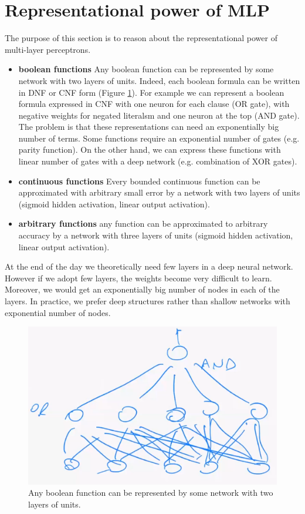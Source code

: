 \section{Representational power of MLP}
The purpose of this section is to reason about the representational power of multi-layer perceptrons.
\begin{itemize}
    \item \textbf{boolean functions} Any boolean function can be represented by some network with two layers of units. Indeed, each boolean formula can be written in DNF or CNF form (Figure \ref{fig:brutto_deep_boolean_fun}). For example we can represent a boolean formula expressed in CNF with one neuron for each clause (OR gate), with negative weights for negated literalsm and one neuron at the top (AND gate). The problem is that these representations can need an exponentially big number of terms. Some functions require an exponential number of gates (e.g. parity function). On the other hand, we can express these functions with linear number of gates with a deep network (e.g. combination of XOR gates).
    
    \item \textbf{continuous functions} Every bounded continuous function can be approximated with arbitrary small error by a network with two layers of units (sigmoid hidden activation, linear output activation).
    
    \item \textbf{arbitrary functions} any function can be approximated to arbitrary accuracy by a network with three layers of units (sigmoid hidden activation, linear output activation).
\end{itemize}

At the end of the day we theoretically need few layers in a deep neural network. However if we adopt few layers, the weights become very difficult to learn. Moreover, we would get an exponentially big number of nodes in each of the layers. In practice, we prefer deep structures rather than shallow networks with exponential number of nodes.

\begin{figure}
    \centering
    \includegraphics[scale=0.5]{images/brutto_deep_boolean_fun.png}
    \caption{Any boolean function can be represented by some network with two layers of units.}
    \label{fig:brutto_deep_boolean_fun}
\end{figure}

